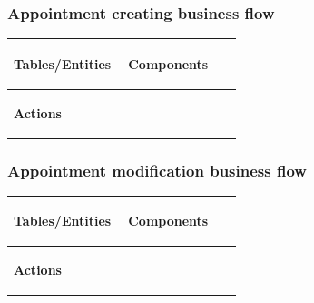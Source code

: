 \documentclass[]{VUMIFTemplateClass}
\newenvironment{mpitemlist}[1][\linewidth]{%
    \begin{minipage}[t]{#1}%
        \setlength{\leftmargini}{12pt}%
        \begin{itemize}%
            \setlength{\itemsep}{1pt}%
            \setlength{\parskip}{0pt}%
            \setlength{\parsep}{0pt}%
}{%
        \end{itemize}%
    \end{minipage}\newline
}
\begin{document}
\vspace{1cm}


\subsubsection{Appointment creating business flow}



\begin{center}
\setlength{\tabcolsep}{8pt}
\begin{tabular}{|p{0.48\linewidth}|p{0.48\linewidth}|}
\hline
\textbf{Tables/Entities} \newline
\begin{mpitemlist}

\end{mpitemlist}
&
\textbf{Components} \newline
\begin{mpitemlist}

\end{mpitemlist}
\\ \hline
\textbf{Actions} \newline
\begin{mpitemlist}

\end{mpitemlist}
&

\\ \hline
\end{tabular}
\end{center}


\subsubsection{Appointment modification business flow}




\begin{center}
\setlength{\tabcolsep}{8pt}
\begin{tabular}{|p{0.48\linewidth}|p{0.48\linewidth}|}
\hline
\textbf{Tables/Entities} \newline
\begin{mpitemlist}

\end{mpitemlist}
&
\textbf{Components} \newline
\begin{mpitemlist}

\end{mpitemlist}
\\ \hline
\textbf{Actions} \newline
\begin{mpitemlist}

\end{mpitemlist}
&

\\ \hline
\end{tabular}
\end{center}
\end{document}
